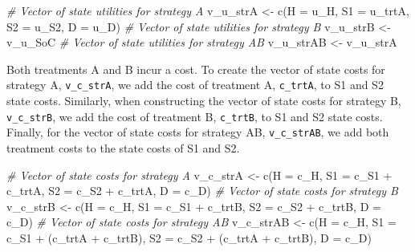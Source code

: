 \documentclass[
]{article}
\newenvironment{Shaded}{\begin{snugshade}}{\end{snugshade}}
\newcommand{\AttributeTok}[1]{\textcolor[rgb]{0.77,0.63,0.00}{#1}}
\newcommand{\CommentTok}[1]{\textcolor[rgb]{0.56,0.35,0.01}{\textit{#1}}}
\newcommand{\FunctionTok}[1]{\textcolor[rgb]{0.00,0.00,0.00}{#1}}
\newcommand{\NormalTok}[1]{#1}
\newcommand{\OtherTok}[1]{\textcolor[rgb]{0.56,0.35,0.01}{#1}}
\newcommand{\SpecialCharTok}[1]{\textcolor[rgb]{0.00,0.00,0.00}{#1}}
\begin{document}
\begin{Shaded}
\begin{Highlighting}[]
\CommentTok{\# Vector of state utilities for strategy A}
\NormalTok{v\_u\_strA }\OtherTok{\textless{}{-}} \FunctionTok{c}\NormalTok{(}\AttributeTok{H =}\NormalTok{ u\_H, }\AttributeTok{S1 =}\NormalTok{ u\_trtA, }\AttributeTok{S2 =}\NormalTok{ u\_S2, }\AttributeTok{D =}\NormalTok{ u\_D)}
\CommentTok{\# Vector of state utilities for strategy B}
\NormalTok{v\_u\_strB }\OtherTok{\textless{}{-}}\NormalTok{ v\_u\_SoC}
\CommentTok{\# Vector of state utilities for strategy AB}
\NormalTok{v\_u\_strAB }\OtherTok{\textless{}{-}}\NormalTok{ v\_u\_strA}
\end{Highlighting}
\end{Shaded}

Both treatments A and B incur a cost. To create the vector of state costs for strategy A, \texttt{v\_c\_strA}, we add the cost of treatment A, \texttt{c\_trtA}, to S1 and S2 state costs. Similarly, when constructing the vector of state costs for strategy B, \texttt{v\_c\_strB}, we add the cost of treatment B, \texttt{c\_trtB}, to S1 and S2 state costs. Finally, for the vector of state costs for strategy AB, \texttt{v\_c\_strAB}, we add both treatment costs to the state costs of S1 and S2.

\begin{Shaded}
\begin{Highlighting}[]
\CommentTok{\# Vector of state costs for strategy A}
\NormalTok{v\_c\_strA }\OtherTok{\textless{}{-}} \FunctionTok{c}\NormalTok{(}\AttributeTok{H  =}\NormalTok{ c\_H, }
              \AttributeTok{S1 =}\NormalTok{ c\_S1 }\SpecialCharTok{+}\NormalTok{ c\_trtA, }
              \AttributeTok{S2 =}\NormalTok{ c\_S2 }\SpecialCharTok{+}\NormalTok{ c\_trtA, }
              \AttributeTok{D  =}\NormalTok{ c\_D)}
\CommentTok{\# Vector of state costs for strategy B}
\NormalTok{v\_c\_strB }\OtherTok{\textless{}{-}} \FunctionTok{c}\NormalTok{(}\AttributeTok{H  =}\NormalTok{ c\_H, }
              \AttributeTok{S1 =}\NormalTok{ c\_S1 }\SpecialCharTok{+}\NormalTok{ c\_trtB, }
              \AttributeTok{S2 =}\NormalTok{ c\_S2 }\SpecialCharTok{+}\NormalTok{ c\_trtB, }
              \AttributeTok{D  =}\NormalTok{ c\_D)}
\CommentTok{\# Vector of state costs for strategy AB}
\NormalTok{v\_c\_strAB }\OtherTok{\textless{}{-}} \FunctionTok{c}\NormalTok{(}\AttributeTok{H  =}\NormalTok{ c\_H, }
               \AttributeTok{S1 =}\NormalTok{ c\_S1 }\SpecialCharTok{+}\NormalTok{ (c\_trtA }\SpecialCharTok{+}\NormalTok{ c\_trtB), }
               \AttributeTok{S2 =}\NormalTok{ c\_S2 }\SpecialCharTok{+}\NormalTok{ (c\_trtA }\SpecialCharTok{+}\NormalTok{ c\_trtB), }
               \AttributeTok{D  =}\NormalTok{ c\_D)}
\end{Highlighting}
\end{Shaded}
\end{document}
